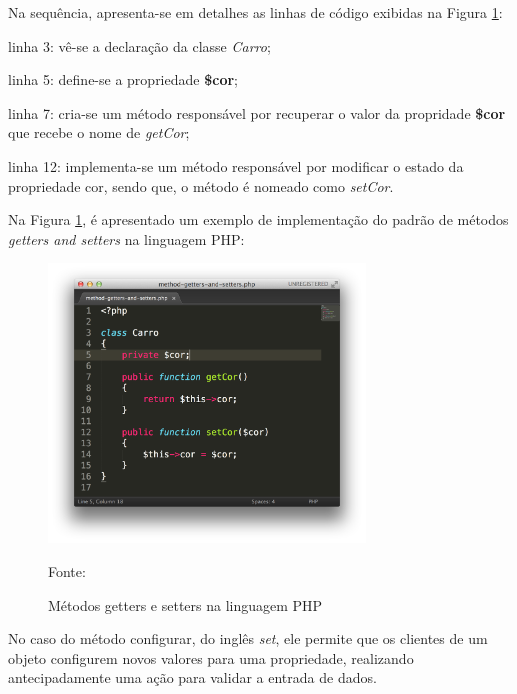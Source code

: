 Na sequência, apresenta-se em detalhes as linhas de código exibidas na Figura
\ref{fig:methodGettersAndSetters}:

\begin{alineas}
    \item linha 3: vê-se a declaração da classe \textit{Carro};
    \item linha 5: define-se a propriedade \textbf{\$cor};
    \item linha 7: cria-se um método responsável por recuperar o valor da
    propridade \textbf{\$cor} que recebe o nome de \textit{getCor};
    \item linha 12: implementa-se um método responsável por modificar o estado
    da propriedade cor, sendo que, o método é nomeado como \textit{setCor}.
\end{alineas}

Na Figura \ref{fig:methodGettersAndSetters}, é apresentado um exemplo
de implementação do padrão de métodos \textit{getters and setters} na
linguagem \acs{PHP}:

\begin{figure}[h!tb]
	\caption{Métodos getters e setters na linguagem PHP}
	\label{fig:methodGettersAndSetters}

	\centering
	\includegraphics[width=0.75\textwidth]{images/method-getters-and-setters.png}

	\centering
	\footnotesize Fonte: \fonteOAutor
\end{figure}

\FloatBarrier 	%

No caso do método configurar, do inglês \textit{set}, ele permite que os
clientes de um objeto configurem novos valores para uma propriedade, realizando
antecipadamente uma ação para validar a entrada de dados.


